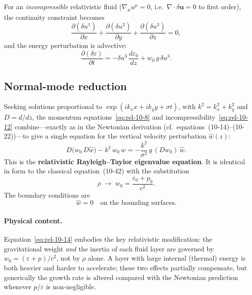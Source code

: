 For an \emph{incompressible} relativistic fluid
($\nabla_{\mu}u^{\mu}=0$, i.e.\ $\nabla\!\cdot\!\delta\boldsymbol{u}=0$
to first order), the continuity constraint becomes
\begin{equation}
\label{eq:rel-10-12}
\frac{\partial(\delta u^{1})}{\partial x}
+ \frac{\partial(\delta u^{2})}{\partial y}
+ \frac{\partial(\delta u^{3})}{\partial z} = 0,
\end{equation}
and the energy perturbation is advective:
\begin{equation}
\label{eq:rel-10-13}
\frac{\partial(\delta\varepsilon)}{\partial t}
= -\delta u^{3}\,\frac{d\varepsilon_{0}}{dz}
  + w_{0}\,g\,\delta u^{3}.
\end{equation}

\subsection{Normal-mode reduction}
\label{sec:rel-91-normalmodes}

Seeking solutions proportional to
$\exp(ik_{x}x + ik_{y}y + \sigma t)$, with
$k^{2}=k_{x}^{2}+k_{y}^{2}$ and $D = d/dz$, the momentum
equations~\eqref{eq:rel-10-8} and incompressibility~\eqref{eq:rel-10-12}
combine---exactly as in the Newtonian derivation (cf.\
equations~(10-14)--(10-22))---to give a single equation for the vertical
velocity perturbation $\hat{w}(z)$:
\begin{equation}
\boxed{
D\!\bigl(w_{0}\,D\hat{w}\bigr) - k^{2}\,w_{0}\,\hat{w}
= -\frac{k^{2}}{\sigma^{2}}\,g\,(Dw_{0})\,\hat{w}.
}
\label{eq:rel-10-14}
\end{equation}
This is the \textbf{relativistic Rayleigh--Taylor eigenvalue equation}.
It is identical in form to the classical equation~(10-42) with the
substitution
\begin{equation}
\label{eq:rel-10-15}
\rho \;\longrightarrow\; w_{0}
= \frac{\varepsilon_{0}+p_{0}}{c^{2}}.
\end{equation}
The boundary conditions are
\begin{equation}
\label{eq:rel-10-16}
\hat{w} = 0 \quad\text{on the bounding surfaces.}
\end{equation}

\paragraph{Physical content.}
Equation~\eqref{eq:rel-10-14} embodies the key relativistic modification:
the gravitational weight \emph{and} the inertia of each fluid layer are
governed by $w_{0} = (\varepsilon+p)/c^{2}$, not by $\rho$ alone.  A
layer with large internal (thermal) energy is both heavier and harder to
accelerate; these two effects partially compensate, but generically the
growth rate is altered compared with the Newtonian prediction whenever
$p/\varepsilon$ is non-negligible.

